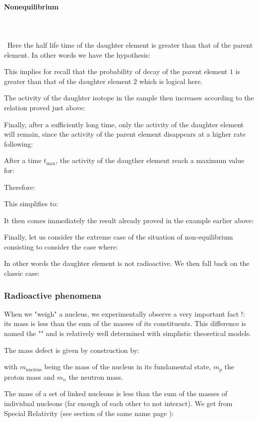	\paragraph{Nonequilibrium}\mbox{}\\\\\
	Here the half life time of the daughter element is greater than that of the parent element. In other words we have the hypothesis:
	
	This implies for recall that the probability of decay of the parent element $1$ is greater than that of the daughter element $2$ which is logical here.

	The activity of the daughter isotope in the sample then increases according to the relation proved just above:
	
	Finally, after a sufficiently long time, only the activity of the daughter element will remain, since the activity of the parent element disappears at a higher rate following:
	
	After a time $t_{\max}$, the activity of the daugther element reach a maximum value for:
	
	Therefore:
	
	This simplifies to:
	
	It then comes immediately the result already proved in the example earlier above:
	
	Finally, let us consider the extreme case of the situation of non-equilibrium consisting to consider the case where:
	
	In other words the daughter element is not radioactive. We then fall back on the classic case:
	
	
	\subsubsection{Radioactive phenomena}
	When we "weigh" a nucleus, we experimentally observe a very important fact !: its mass is less than the sum of the masses of its constituents. This difference is named the "" and is relatively well determined with simplistic theoretical models.

	The mass defect is given by construction by:
	
	with $m_\text{nucleus}$ being the mass of the nucleus in its fundamental state, $m_p$ the proton mass and $m_n$  the neutron mass.

	The mass of a set of linked nucleons is less than the sum of the masses of individual nucleons (far enough of each other to not interact). We get from Special Relativity (see section of the same name page \pageref{mass energy equivalence}):
	
